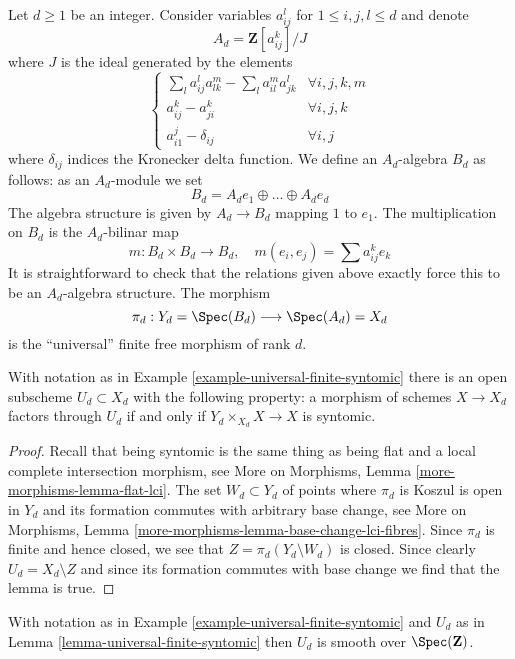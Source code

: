\begin{example}
\label{example-universal-finite-syntomic}
Let $d \geq 1$ be an integer. Consider variables
$a_{ij}^l$ for $1 \leq i, j, l \leq d$ and denote
$$
A_d = \mathbf{Z}[a_{ij}^k]/J
$$
where $J$ is the ideal generated by the elements
$$
\left\{
\begin{matrix}
\sum_l a_{ij}^la_{lk}^m - \sum_l a_{il}^ma_{jk}^l & \forall i, j, k, m \\
a_{ij}^k - a_{ji}^k & \forall i, j, k \\
a_{i1}^j - \delta_{ij} & \forall i, j
\end{matrix}
\right.
$$
where $\delta_{ij}$ indices the Kronecker delta function.
We define an $A_d$-algebra $B_d$ as follows: as an $A_d$-module we set
$$
B_d = A_d e_1 \oplus \ldots \oplus A_d e_d
$$
The algebra structure is given by $A_d \to B_d$ mapping $1$ to $e_1$.
The multiplication on $B_d$ is the $A_d$-bilinar map
$$
m : B_d \times B_d \longrightarrow B_d, \quad
m(e_i, e_j) = \sum a_{ij}^k e_k
$$
It is straightforward to check that the relations given above
exactly force this to be an $A_d$-algebra structure.
The morphism
$$
\pi_d : Y_d = \Spec(B_d) \longrightarrow \Spec(A_d) = X_d
$$
is the ``universal'' finite free morphism of rank $d$.
\end{example}

\begin{lemma}
\label{lemma-universal-finite-syntomic}
With notation as in Example \ref{example-universal-finite-syntomic}
there is an open subscheme $U_d \subset X_d$ with the following property:
a morphism of schemes $X \to X_d$ factors through $U_d$ if and only
if $Y_d \times_{X_d} X \to X$ is syntomic.
\end{lemma}

\begin{proof}
Recall that being syntomic is the same thing as being flat and
a local complete intersection morphism, see
More on Morphisms, Lemma \ref{more-morphisms-lemma-flat-lci}.
The set $W_d \subset Y_d$ of points where $\pi_d$ is Koszul
is open in $Y_d$ and its formation commutes with arbitrary base change, see
More on Morphisms, Lemma \ref{more-morphisms-lemma-base-change-lci-fibres}.
Since $\pi_d$ is finite and hence closed, we see that
$Z = \pi_d(Y_d \setminus W_d)$ is closed. Since clearly $U_d = X_d \setminus Z$
and since its formation commutes with base change we find that the lemma
is true.
\end{proof}

\begin{lemma}
\label{lemma-universal-finite-syntomic-smooth}
With notation as in Example \ref{example-universal-finite-syntomic}
and $U_d$ as in Lemma \ref{lemma-universal-finite-syntomic}
then $U_d$ is smooth over $\Spec(\mathbf{Z})$.
\end{lemma}

